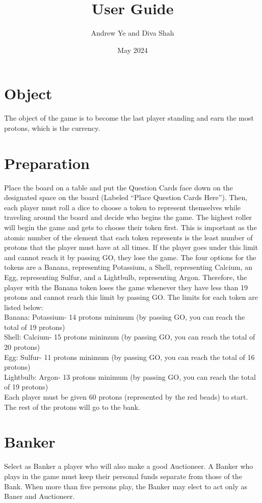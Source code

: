 \documentclass{article}
\title{User Guide}
\author{Andrew Ye and Diva Shah}
\date{May 2024}
\begin{document}
\maketitle
\newpage
\tableofcontents
\newpage
\section{Object}
The object of the game is to become the last player standing and earn the most protons, which is the currency. 
\section{Preparation}
Place the board on a table and put the Question Cards face down on the designated space on the board (Labeled “Place Question Cards Here”). Then, each player must roll a dice to choose a token to represent themselves while traveling around the board and decide who begins the game. The highest roller will begin the game and gets to choose their token first. This is important as the atomic number of the element that each token represents is the least number of protons that the player must have at all times. If the player goes under this limit and cannot reach it by passing GO, they lose the game. The four options for the tokens are a Banana, representing Potassium, a Shell, representing Calcium, an Egg, representing Sulfur, and a Lightbulb, representing Argon. Therefore, the player with the Banana token loses the game whenever they have less than 19 protons and cannot reach this limit by passing GO. The limits for each token are listed below:\\ 
Banana: Potassium- 14 protons minimum (by passing GO, you can reach the total of 19 protons)\\
Shell: Calcium- 15 protons minimum (by passing GO, you can reach the total of 20 protons) \\
Egg: Sulfur- 11 protons minimum (by passing GO, you can reach the total of 16 protons) \\
Lightbulb: Argon- 13 protons minimum (by passing GO, you can reach the total of 19 protons) \\
Each player must be given 60 protons (represented by the red beads) to start. The rest of the protons will go to the bank. 
\section{Banker}
Select as Banker a player who will also make a good Auctioneer. A Banker who plays in the game must keep their personal funds separate from those of the Bank. When more than five persons play, the Banker may elect to act only as Baner and Auctioneer.
\end{document}
